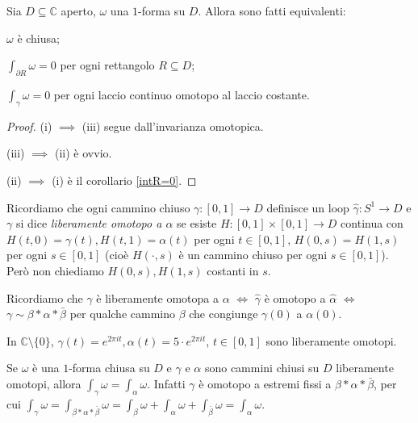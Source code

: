 \begin{thm} \label{chiusa^int=0}
  Sia $D \subseteq \mathbb{C}$ aperto, $\omega$ una $1$-forma su $D$. Allora sono fatti equivalenti:
  \begin{nlist}
    \item $\omega$ è chiusa;
    \item $\displaystyle \int_{\partial R} \omega=0$ per ogni rettangolo $R \subseteq D$;
    \item $\displaystyle \int_{\gamma}\omega=0$ per ogni laccio continuo omotopo al laccio costante.
  \end{nlist}
\end{thm}

\begin{proof}
  (i) $\implies$ (iii) segue dall'invarianza omotopica.

  (iii) $\implies$ (ii) è ovvio.

  (ii) $\implies$ (i) è il corollario \ref{intR=0}.
\end{proof}

\begin{defn}
  Ricordiamo che ogni cammino chiuso $\gamma:[0, 1] \longrightarrow D$ definisce un loop $\hat{\gamma}:S^1 \longrightarrow D$ e $\gamma$ si dice \textit{liberamente omotopo a $\alpha$} se esiste $H:[0,1]\times[0,1] \longrightarrow D$ continua con $H(t,0)=\gamma(t), H(t,1)=\alpha(t)$ per ogni $t \in [0,1]$, $H(0, s)=H(1,s)$ per ogni $s \in [0,1]$
  (cioè $H(\cdot, s)$ è un cammino chiuso per ogni $s \in[0,1]$). Però non chiediamo $H(0,s),H(1,s)$ costanti in $s$.
\end{defn}

Ricordiamo che $\gamma$ è liberamente omotopa a $\alpha$ $\iff$ $\hat{\gamma}$ è omotopo a $\hat{\alpha}$ $\iff$ $\gamma \sim \beta*\alpha*\bar{\beta}$ per qualche cammino $\beta$ che congiunge $\gamma(0)$ a $\alpha(0)$.

\begin{ex}
  In $\mathbb{C}\setminus\{0\}$, $\gamma(t)=e^{2\pi it}, \alpha(t)=5\cdot e^{2\pi i t}$, $t \in [0,1]$ sono liberamente omotopi.
\end{ex}

\begin{ftt}
  Se $\omega$ è una $1$-forma chiusa su $D$ e $\gamma$ e $\alpha$ sono cammini chiusi su $D$ liberamente omotopi, allora $\displaystyle \int_{\gamma} \omega=\int_{\alpha}\omega$.
  Infatti $\gamma$ è omotopo a estremi fissi a $\beta*\alpha*\bar{\beta}$, per cui $\displaystyle \int_{\gamma} \omega=\int_{\beta*\alpha*\bar{\beta}} \omega=\int_{\beta}\omega+\int_{\alpha}\omega+\int_{\bar{\beta}}\omega=\int_{\alpha}\omega$.
\end{ftt}
